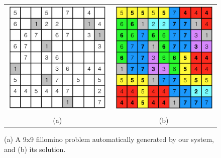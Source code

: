 \begin{figure}[!htpb]
\centering
\begin{tabular}{c c}
\includegraphics[scale=0.40]{puzzlefigs/fillomino_prob.png}
&
\includegraphics[scale=0.40]{puzzlefigs/fillomino_sol.png}
\\
(a) & (b)
\end{tabular}
\caption{(a) A 9x9 fillomino problem automatically generated by our system, and (b) its solution.}
\label{fillominoprobsol}
\end{figure}

